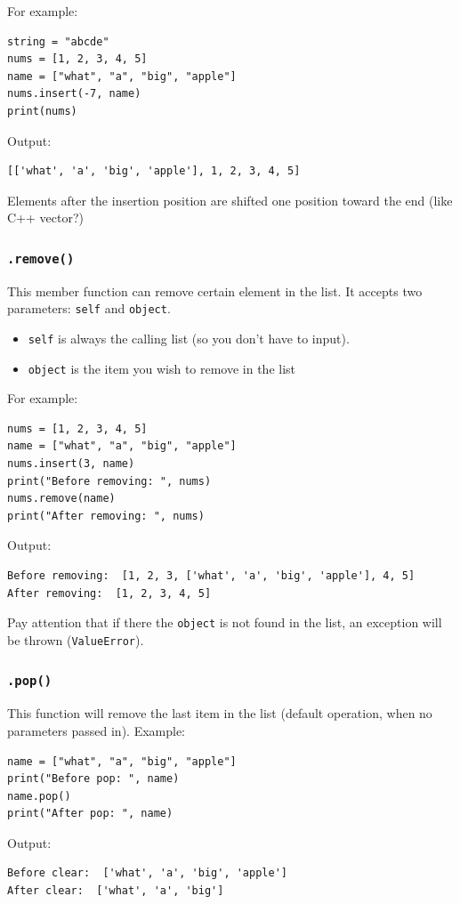 \documentclass[12pt]{book}
\begin{document}
For example:
\begin{verbatim}
string = "abcde"
nums = [1, 2, 3, 4, 5]
name = ["what", "a", "big", "apple"]
nums.insert(-7, name)
print(nums)
\end{verbatim}
Output:
\begin{verbatim}
[['what', 'a', 'big', 'apple'], 1, 2, 3, 4, 5]
\end{verbatim}

Elements after the insertion position are shifted one position toward the end (like C++ vector?)
\subsubsection{\texttt{.remove()}}
\label{sec:orgb3fe8fb}
This member function can remove certain element in the list. It accepts two parameters: \texttt{self} and \texttt{object}.
\begin{itemize}
\item \texttt{self} is always the calling list (so you don't have to input).
\item \texttt{object} is the item you wish to remove in the list
\end{itemize}

For example:
\begin{verbatim}
nums = [1, 2, 3, 4, 5]
name = ["what", "a", "big", "apple"]
nums.insert(3, name)
print("Before removing: ", nums)
nums.remove(name)
print("After removing: ", nums)
\end{verbatim}
Output:
\begin{verbatim}
Before removing:  [1, 2, 3, ['what', 'a', 'big', 'apple'], 4, 5]
After removing:  [1, 2, 3, 4, 5]
\end{verbatim}

Pay attention that if there the \texttt{object} is not found in the list, an exception will be thrown (\texttt{ValueError}).
\subsubsection{\texttt{.pop()}}
\label{sec:orgf7cd512}
This function will remove the last item in the list (default operation, when no parameters passed in). Example:
\begin{verbatim}
name = ["what", "a", "big", "apple"]
print("Before pop: ", name)
name.pop()
print("After pop: ", name)
\end{verbatim}
Output:
\begin{verbatim}
Before clear:  ['what', 'a', 'big', 'apple']
After clear:  ['what', 'a', 'big']
\end{verbatim}
\end{document}
